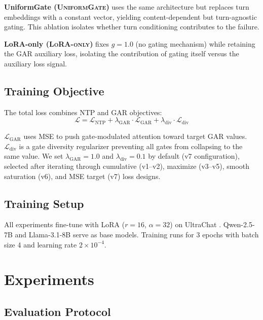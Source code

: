 \documentclass[11pt]{article}
\newcommand{\gar}{\textsc{GAR}}
\newcommand{\ug}{\textsc{UniformGate}}
\newcommand{\lo}{\textsc{LoRA-only}}
\begin{document}
\textbf{UniformGate (\ug{})} uses the same architecture but replaces turn embeddings with a constant vector, yielding content-dependent but turn-agnostic gating. This ablation isolates whether turn conditioning contributes to the failure.

\textbf{LoRA-only (\lo{})} fixes $g=1.0$ (no gating mechanism) while retaining the \gar{} auxiliary loss, isolating the contribution of gating itself versus the auxiliary loss signal.

\subsection{Training Objective}

The total loss combines NTP and \gar{} objectives:
\begin{equation}
    \mathcal{L} = \mathcal{L}_{\text{NTP}} + \lambda_{\text{GAR}} \cdot \mathcal{L}_{\text{GAR}} + \lambda_{\text{div}} \cdot \mathcal{L}_{\text{div}}
\end{equation}

$\mathcal{L}_{\text{GAR}}$ uses MSE to push gate-modulated attention toward target \gar{} values. $\mathcal{L}_{\text{div}}$ is a gate diversity regularizer preventing all gates from collapsing to the same value. We set $\lambda_{\text{GAR}} = 1.0$ and $\lambda_{\text{div}} = 0.1$ by default (v7 configuration), selected after iterating through cumulative (v1--v2), maximize (v3--v5), smooth saturation (v6), and MSE target (v7) loss designs.

\subsection{Training Setup}

All experiments fine-tune with LoRA ($r=16$, $\alpha=32$) on UltraChat \citep{ding2023enhancing}. Qwen-2.5-7B \citep{qwen2025qwen25} and Llama-3.1-8B \citep{dubey2024llama3} serve as base models. Training runs for 3 epochs with batch size 4 and learning rate $2\times10^{-4}$.

\section{Experiments}

\subsection{Evaluation Protocol}
\end{document}
